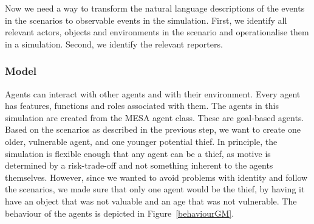 \documentclass[12pt]{article}
\begin{document}
Now we need a way to transform the natural language descriptions of the events in the scenarios to observable events in the simulation. First, we identify all relevant actors, objects and environments in the scenario and operationalise them in a simulation. Second, we identify the relevant reporters. 



\subsubsection{Model} 


Agents can interact with other agents and with their environment. Every agent has features, functions and roles associated with them. The agents in this simulation are created from the MESA agent class. These are goal-based agents.
Based on the scenarios as described in the previous step, we want to create one older, vulnerable agent, and one younger potential thief. In principle, the simulation is flexible enough that any agent can be a thief, as motive is determined by a risk-trade-off and not something inherent to the agents themselves. However, since we wanted to avoid problems with identity and follow the scenarios, we made sure that only one agent would be the thief, by having it have an object that was not valuable and an age that was not vulnerable. The behaviour of the agents is depicted in Figure~\ref{behaviourGM}.
\end{document}

